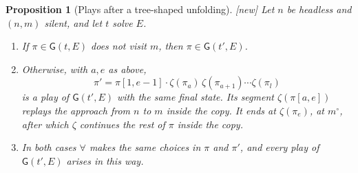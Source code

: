 \documentclass[11pt]{article}
\newcommand{\Gm}{\mathsf{G}}
\newcommand{\iv}[2]{\pi[#1,#2]}
\newcommand{\New}{\textsf{[new]}}
\theoremstyle{plain}
\newtheorem{proposition}[theorem]{Proposition}
\theoremstyle{definition}
\theoremstyle{remark}
\begin{document}
\begin{proposition}[Plays after a tree-shaped unfolding]\label{prop:treegame}
\New{} Let $n$ be headless and $(n,m)$ silent, and let $t$ solve $E$.
\begin{enumerate}
\item If $\pi\in\Gm(t,E)$ does not visit $m$, then $\pi\in\Gm(t',E)$.
\item Otherwise, with $a,e$ as above,
  \[
  \pi'=\iv1{e-1}\cdot\zeta(\pi_a)\,\zeta(\pi_{a+1})\cdots\zeta(\pi_l)
  \]
  is a play of $\Gm(t',E)$ with the same final state.  Its segment
  $\zeta(\iv ae)$ replays the approach from $n$ to $m$ inside the copy.
  It ends at $\zeta(\pi_e)$, at $m^\circ$, after which $\zeta$ continues
  the rest of $\pi$ inside the copy.
\item In both cases $\forall$ makes the same choices in $\pi$ and
  $\pi'$, and every play of $\Gm(t',E)$ arises in this way.
\end{enumerate}
\end{proposition}
\end{document}
